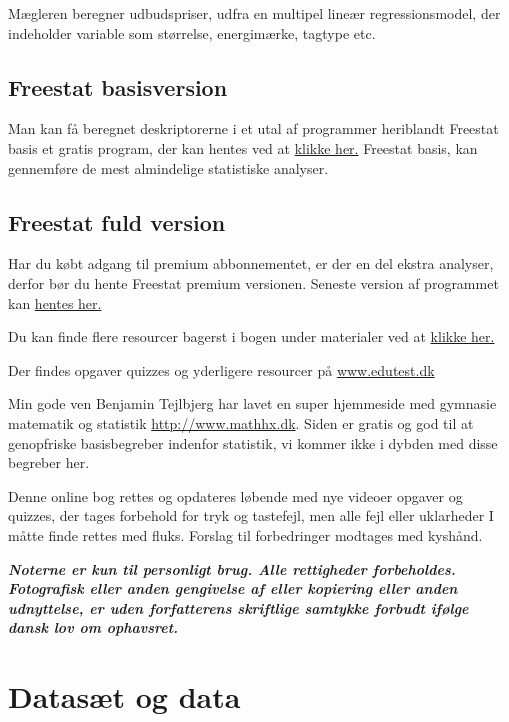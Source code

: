 \documentclass[]{book}
\begin{document}
Mægleren beregner udbudspriser, udfra en multipel lineær regressionsmodel, der indeholder variable som størrelse, energimærke, tagtype etc.

\hypertarget{freestat-basisversion}{%
\section{Freestat basisversion}\label{freestat-basisversion}}

Man kan få beregnet deskriptorerne i et utal af programmer heriblandt Freestat basis et gratis program, der kan hentes ved at \href{https://www.dropbox.com/s/th8q95lf864npie/FREESTATfin.xlsx?dl=1}{klikke her.} Freestat basis, kan gennemføre de mest almindelige statistiske analyser.

\hypertarget{freestat-fuld-version}{%
\section{Freestat fuld version}\label{freestat-fuld-version}}

Har du købt adgang til premium abbonnementet, er der en del ekstra analyser, derfor bør du hente Freestat premium versionen. Seneste version af programmet kan \href{https://www.dropbox.com/s/a2jztexbxfzcli0/FREESTAT.xlsx?dl=1}{hentes her.}

Du kan finde flere resourcer bagerst i bogen under materialer ved at \href{https://s.tepedu.dk/materialer.html}{klikke her.}

Der findes opgaver quizzes og yderligere resourcer på \href{http://www.edutest.dk}{www.edutest.dk}

Min gode ven Benjamin Tejlbjerg har lavet en super hjemmeside med gymnasie matematik og statistik \href{http://www.mathhx.dk/?q=node/117}{http://www.mathhx.dk}. Siden er gratis og god til at genopfriske basisbegreber indenfor statistik, vi kommer ikke i dybden med disse begreber her.

Denne online bog rettes og opdateres løbende med nye videoer opgaver og quizzes, der tages forbehold for tryk og tastefejl, men alle fejl eller uklarheder I måtte finde rettes med fluks. Forslag til forbedringer modtages med kyshånd.

\textbf{\emph{Noterne er kun til personligt brug. Alle rettigheder forbeholdes. Fotografisk eller anden gengivelse af eller kopiering eller anden udnyttelse, er uden forfatterens skriftlige samtykke forbudt ifølge dansk lov om ophavsret.}}

\hypertarget{datast-og-data}{%
\chapter{Datasæt og data}\label{datast-og-data}}
\end{document}

